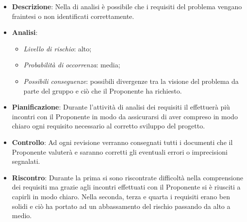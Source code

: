 			\begin{itemize}
				\item \textbf{Descrizione}: Nella  di analisi è possibile che i requisiti del problema vengano fraintesi o non identificati correttamente. 
				\item \textbf{Analisi}:
				\begin{itemize}
					\item \textit{Livello di rischio}: alto;
					\item \textit{Probabilità di occorrenza}: media;
					\item \textit{Possibili conseguenze}: possibili divergenze tra la visione del problema da parte del gruppo e ciò che il Proponente ha richiesto.
				\end{itemize}
				\item \textbf{Pianificazione}: Durante l'attività di analisi dei requisiti il  effettuerà più incontri con il Proponente in modo da assicurarsi di aver compreso in modo chiaro ogni requisito necessario al corretto sviluppo del progetto.
				\item \textbf{Controllo}: Ad ogni revisione verranno consegnati tutti i documenti che il Proponente valuterà e saranno corretti gli eventuali errori o imprecisioni segnalati.
				\item \textbf{Riscontro}: Durante la prima  si sono riscontrate difficoltà nella comprensione dei requisiti ma grazie agli incontri effettuati con il Proponente si è riusciti a capirli in modo chiaro. Nella seconda, terza e quarta  i requisiti erano ben solidi e ciò ha portato ad un abbassamento del rischio passando da alto a medio.
			\end{itemize}
